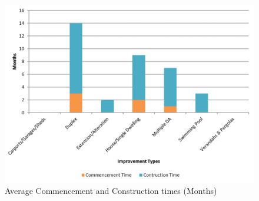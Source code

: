 \documentclass[AEJ,reqno, draftmode]{AEA} %
\begin{document}
\begin{figure}[!h]
    \centering
     \includegraphics[width=\columnwidth]{Figures/cm_ct_times2.png} \par
 \caption{Average Commencement and Construction times (Months)}
 \label{fig:Cm_ct_times}
\end{figure}
\end{document}
